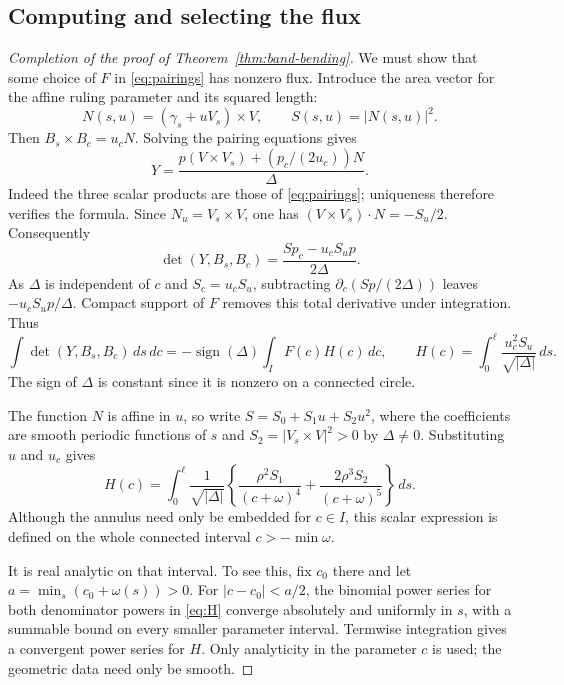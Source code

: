 \documentclass[11pt]{amsart}
\theoremstyle{definition}
\begin{document}
\subsection{Computing and selecting the flux}
\begin{proof}[Completion of the proof of Theorem~\ref{thm:band-bending}]
We must show that some choice of $F$ in \eqref{eq:pairings} has
nonzero flux. Introduce the area vector for the affine ruling
parameter and its squared length:
\[
 N(s,u)=(\gamma_s+uV_s)\times V,\qquad S(s,u)=|N(s,u)|^2 .
\]
Then $B_s\times B_c=u_cN$.
Solving the pairing equations gives
\[
 Y=\frac{p(V\times V_s)+(p_c/(2u_c))N}{\Delta}.
\]
Indeed the three scalar products are those of \eqref{eq:pairings};
uniqueness therefore verifies the formula. Since
$N_u=V_s\times V$, one has
$(V\times V_s)\cdot N=-S_u/2$.
Consequently
\[
 \det(Y,B_s,B_c)
       =\frac{Sp_c-u_cS_up}{2\Delta}.
\]
As $\Delta$ is independent of $c$ and $S_c=u_cS_u$, subtracting
$\partial_c(Sp/(2\Delta))$ leaves $-u_cS_up/\Delta$.
Compact support of $F$ removes this total derivative under
integration. Thus
\begin{equation}\label{eq:flux-kernel}
 \int\det(Y,B_s,B_c)\,ds\,dc
 =-\operatorname{sign}(\Delta)\int_I F(c)H(c)\,dc,\qquad
 H(c)=\int_0^\ell\frac{u_c^2S_u}{\sqrt{|\Delta|}}\,ds.
\end{equation}
The sign of $\Delta$ is constant since it is nonzero on a connected
circle.

The function $N$ is affine in $u$, so write
$S=S_0+S_1u+S_2u^2$, where the coefficients are smooth periodic
functions of $s$ and
$S_2=|V_s\times V|^2>0$ by $\Delta\ne0$.
Substituting $u$ and $u_c$ gives
\begin{equation}\label{eq:H}
 H(c)=\int_0^\ell\frac1{\sqrt{|\Delta|}}
 \left\{\frac{\rho^2S_1}{(c+\omega)^4}
       +\frac{2\rho^3S_2}{(c+\omega)^5}\right\}\,ds.
\end{equation}
Although the annulus need only be embedded for $c\in I$,
this scalar expression is defined on the whole connected interval
$c>-\min\omega$.

It is real analytic on that interval. To see this, fix $c_0$ there
and let $a=\min_s(c_0+\omega(s))>0$.
For $|c-c_0|<a/2$, the binomial power series for both denominator
powers in \eqref{eq:H} converge absolutely and uniformly in $s$,
with a summable bound on every smaller parameter interval.
Termwise integration gives a convergent power series for $H$.
Only analyticity in the parameter $c$ is used; the geometric
data need only be smooth.


\end{proof}
\end{document}
